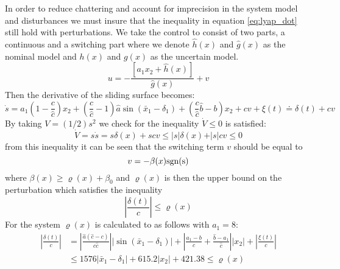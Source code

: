 In order to reduce chattering and account for imprecision in the system model and disturbances we must insure that the inequality in equation \ref{eq:lyap_dot} still hold with perturbations. We take the control to consist of two parts, a continuous and a switching part where we denote $\hat{h}(x)$ and $\hat{g}(x)$ as the nominal model and $h(x)$ and $g(x)$ as the uncertain model.
\begin{equation}
        u = - \frac{[a_1 x_2 + \hat{h}(x)]}{\hat{g}(x)} + v
\end{equation}
Then the derivative of the sliding surface becomes:
\begin{equation}
        \dot{s} = a_1\left(1 - \frac{c}{\hat{c}}\right) x_2 + \left(\frac{c}{\hat{c}} - 1\right)\hat{a} \sin (\bar{x}_1 - \delta_1) + \left(\frac{c}{\hat{c}}\hat{b} - b\right) x_2 + cv + \xi(t) \doteq \delta(t) + cv
\end{equation}
By taking $V = (1/2) s^2$ we check for the inequality $\dot{V} \leq 0$ is satisfied:
\begin{equation}
        \dot{V} = s\dot{s} = s\delta(x) + scv \leq \vert s \vert \delta(x) + \vert s \vert c v \leq 0
\end{equation}
from this inequality it can be seen that the switching term $v$ should be equal to
\begin{equation}
        v = -\beta(x)\mathrm{sgn(s)}
\end{equation}
where $\beta(x) \geq \varrho(x) + \beta_0$ and $\varrho(x)$ is then the upper bound on the perturbation which satisfies the inequality
\begin{equation}
        \left \vert \frac{\delta(t)}{c} \right\vert \leq \varrho(x)
\end{equation}
For the system $\varrho(x)$ is calculated to as follows with $a_1 = 8$:
\begin{equation}
        \begin{split}
                \left \vert \frac{\delta(t)}{c} \right\vert &= \left \vert \frac{\hat{a}(\hat{c}-c)}{c\hat{c}} \right \vert \vert \sin (\bar{x}_1 - \delta_1) \vert + \left \vert \frac{a_1 - b}{c} + \frac{\hat{b} - a_1}{\hat{c}} \right \vert \vert x_2 \vert + \left\vert \frac{\xi(t)}{c}\right\vert \\
                &\leq 1576 \vert \bar{x}_1-\delta_1 \vert + 615.2\vert x_2 \vert + 421.38  \leq \varrho(x)
        \end{split}
\end{equation}
